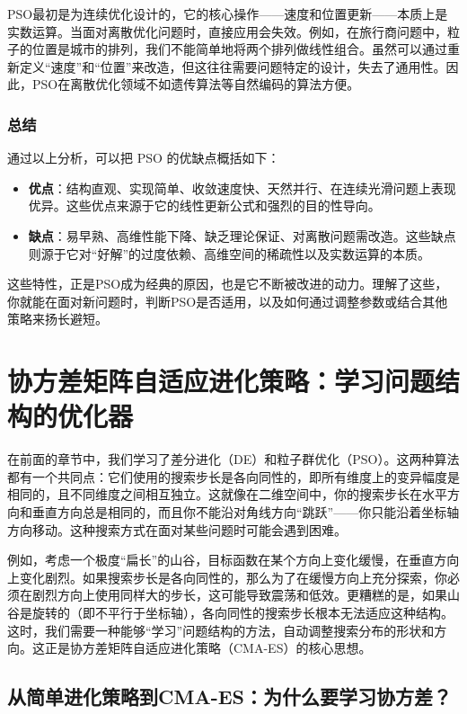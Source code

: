 \documentclass[lang=cn,zihao=-4,a4paper,fontset=windows]{beautybook}
\begin{document}
PSO最初是为连续优化设计的，它的核心操作——速度和位置更新——本质上是实数运算。当面对离散优化问题时，直接应用会失效。例如，在旅行商问题中，粒子的位置是城市的排列，我们不能简单地将两个排列做线性组合。虽然可以通过重新定义“速度”和“位置”来改造，但这往往需要问题特定的设计，失去了通用性。因此，PSO在离散优化领域不如遗传算法等自然编码的算法方便。

\subsubsection{总结}

通过以上分析，可以把 PSO 的优缺点概括如下：

\begin{itemize}
    \item \textbf{优点}：结构直观、实现简单、收敛速度快、天然并行、在连续光滑问题上表现优异。这些优点来源于它的线性更新公式和强烈的目的性导向。
    \item \textbf{缺点}：易早熟、高维性能下降、缺乏理论保证、对离散问题需改造。这些缺点则源于它对“好解”的过度依赖、高维空间的稀疏性以及实数运算的本质。
\end{itemize}

这些特性，正是PSO成为经典的原因，也是它不断被改进的动力。理解了这些，你就能在面对新问题时，判断PSO是否适用，以及如何通过调整参数或结合其他策略来扬长避短。

\section{协方差矩阵自适应进化策略：学习问题结构的优化器}

在前面的章节中，我们学习了差分进化（DE）和粒子群优化（PSO）。这两种算法都有一个共同点：它们使用的搜索步长是各向同性的，即所有维度上的变异幅度是相同的，且不同维度之间相互独立。这就像在二维空间中，你的搜索步长在水平方向和垂直方向总是相同的，而且你不能沿对角线方向“跳跃”——你只能沿着坐标轴方向移动。这种搜索方式在面对某些问题时可能会遇到困难。

例如，考虑一个极度“扁长”的山谷，目标函数在某个方向上变化缓慢，在垂直方向上变化剧烈。如果搜索步长是各向同性的，那么为了在缓慢方向上充分探索，你必须在剧烈方向上使用同样大的步长，这可能导致震荡和低效。更糟糕的是，如果山谷是旋转的（即不平行于坐标轴），各向同性的搜索步长根本无法适应这种结构。这时，我们需要一种能够“学习”问题结构的方法，自动调整搜索分布的形状和方向。这正是协方差矩阵自适应进化策略（CMA-ES）的核心思想。

\subsection{从简单进化策略到CMA-ES：为什么要学习协方差？}
\end{document}
